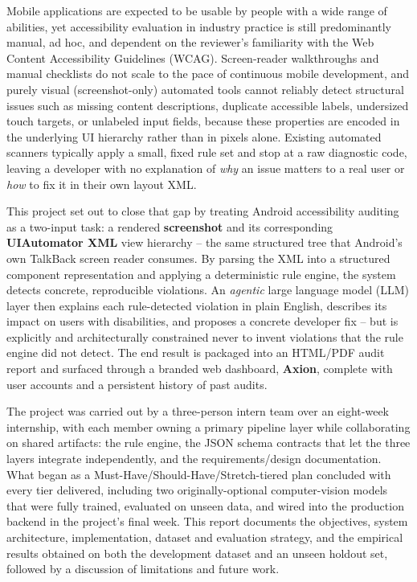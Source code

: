 \documentclass[10pt,conference]{IEEEtran}
\begin{document}
Mobile applications are expected to be usable by people with a wide range of abilities, yet accessibility evaluation in industry practice is still predominantly manual, ad hoc, and dependent on the reviewer's familiarity with the Web Content Accessibility Guidelines (WCAG). Screen-reader walkthroughs and manual checklists do not scale to the pace of continuous mobile development, and purely visual (screenshot-only) automated tools cannot reliably detect structural issues such as missing content descriptions, duplicate accessible labels, undersized touch targets, or unlabeled input fields, because these properties are encoded in the underlying UI hierarchy rather than in pixels alone. Existing automated scanners typically apply a small, fixed rule set and stop at a raw diagnostic code, leaving a developer with no explanation of \emph{why} an issue matters to a real user or \emph{how} to fix it in their own layout XML.

This project set out to close that gap by treating Android accessibility auditing as a two-input task: a rendered \textbf{screenshot} and its corresponding \textbf{UIAutomator XML} view hierarchy -- the same structured tree that Android's own TalkBack screen reader consumes. By parsing the XML into a structured component representation and applying a deterministic rule engine, the system detects concrete, reproducible violations. An \emph{agentic} large language model (LLM) layer then explains each rule-detected violation in plain English, describes its impact on users with disabilities, and proposes a concrete developer fix -- but is explicitly and architecturally constrained never to invent violations that the rule engine did not detect. The end result is packaged into an HTML/PDF audit report and surfaced through a branded web dashboard, \textbf{Axion}, complete with user accounts and a persistent history of past audits.

The project was carried out by a three-person intern team over an eight-week internship, with each member owning a primary pipeline layer while collaborating on shared artifacts: the rule engine, the JSON schema contracts that let the three layers integrate independently, and the requirements/design documentation. What began as a Must-Have/Should-Have/Stretch-tiered plan concluded with every tier delivered, including two originally-optional computer-vision models that were fully trained, evaluated on unseen data, and wired into the production backend in the project's final week. This report documents the objectives, system architecture, implementation, dataset and evaluation strategy, and the empirical results obtained on both the development dataset and an unseen holdout set, followed by a discussion of limitations and future work.
\end{document}
